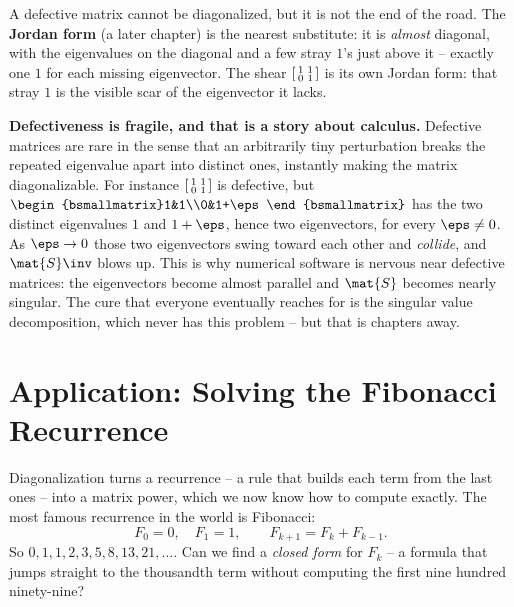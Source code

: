 \begin{remark}
\label{ch24:jordan-preview}
A defective matrix cannot be diagonalized, but it is not the end of the road. The
\textbf{Jordan form} (a later chapter) is the nearest substitute: it is
\emph{almost} diagonal, with the eigenvalues on the diagonal and a few stray
$1$'s just above it -- exactly one $1$ for each missing eigenvector. The shear
$\begin{bsmallmatrix}1&1\\0&1\end{bsmallmatrix}$ is its own Jordan form: that
stray $1$ is the visible scar of the eigenvector it lacks.
\end{remark}

\begin{connectionbox}
\textbf{Defectiveness is fragile, and that is a story about calculus.} Defective
matrices are rare in the sense that an arbitrarily tiny perturbation breaks the
repeated eigenvalue apart into distinct ones, instantly making the matrix
diagonalizable. For instance $\begin{bsmallmatrix}1&1\\0&1\end{bsmallmatrix}$ is
defective, but $\begin{bsmallmatrix}1&1\\0&1+\eps\end{bsmallmatrix}$ has the two
distinct eigenvalues $1$ and $1+\eps$, hence two eigenvectors, for every
$\eps\neq0$. As $\eps\to0$ those two eigenvectors swing toward each other and
\emph{collide}, and $\mat{S}\inv$ blows up. This is why numerical software is
nervous near defective matrices: the eigenvectors become almost parallel and
$\mat{S}$ becomes nearly singular. The cure that everyone eventually reaches for
is the singular value decomposition, which never has this problem -- but that is
chapters away.
\end{connectionbox}

\section{Application: Solving the Fibonacci Recurrence}
\label{ch24:fibonacci}

Diagonalization turns a recurrence -- a rule that builds each term from the last
ones -- into a matrix power, which we now know how to compute exactly. The most
famous recurrence in the world is Fibonacci:
\[
  F_0 = 0,\quad F_1 = 1,\qquad F_{k+1} = F_k + F_{k-1}.
\]
So $0,1,1,2,3,5,8,13,21,\dots$. Can we find a \emph{closed form} for $F_k$ -- a
formula that jumps straight to the thousandth term without computing the first
nine hundred ninety-nine?

